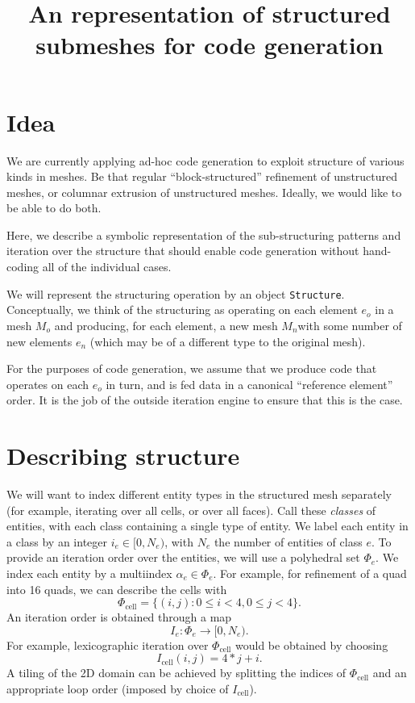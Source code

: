 \documentclass[a4paper,11pt]{article}
\title{An representation of structured submeshes for code generation}
\begin{document}
\maketitle

\section{Idea}
\label{sec:idea}

We are currently applying ad-hoc code generation to exploit structure
of various kinds in meshes. Be that regular ``block-structured''
refinement of unstructured meshes, or columnar extrusion of
unstructured meshes. Ideally, we would like to be able to do both.

Here, we describe a symbolic representation of the sub-structuring patterns
and iteration over the structure that should enable code generation
without hand-coding all of the individual cases.

We will represent the structuring operation by an object
\texttt{Structure}. Conceptually, we think of the structuring as
operating on each element $e_o$ in a mesh $M_o$ and producing, for
each element, a new mesh $M_n$with some number of new elements $e_n$
(which may be of a different type to the original mesh).

For the purposes of code generation, we assume that we produce
code that operates on each $e_o$ in turn, and is fed data in a
canonical ``reference element'' order. It is the job of the outside
iteration engine to ensure that this is the case.

\section{Describing structure}
\label{sec:describing-structure}

We will want to index different entity types in the structured mesh
separately (for example, iterating over all cells, or over all faces).
Call these \emph{classes} of entities, with each class containing a
single type of entity. We label each entity in a class by an integer
$i_e \in [0, N_e)$, with $N_e$ the number of entities of class $e$. To
provide an iteration order over the entities, we will use a polyhedral
set $\Phi_e$. We index each entity by a multiindex
$\alpha_e \in \Phi_e$. For example, for refinement of a quad into 16
quads, we can describe the cells with
\begin{equation}
  \Phi_{\text{cell}} = \{(i, j) \colon 0 \le i < 4, 0 \le j < 4 \}.
\end{equation}
An iteration order is obtained through a map
\begin{equation}
  \label{eq:3}
  I_e \colon \Phi_e \to [0, N_e).
\end{equation}
For example, lexicographic iteration over $\Phi_{\text{cell}}$ would
be obtained by choosing
\begin{equation}
  \label{eq:4}
  I_\text{cell}(i, j) = 4*j + i.
\end{equation}
A tiling of the 2D domain can be achieved by splitting the indices of
$\Phi_{\text{cell}}$ and an appropriate loop order (imposed by choice
of $I_\text{cell}$).
\end{document}

